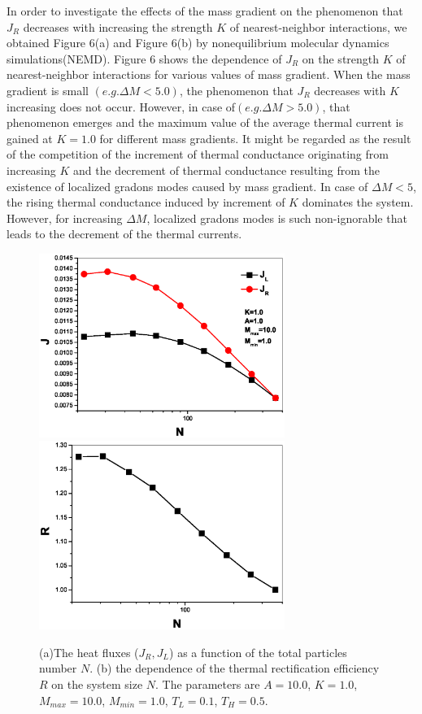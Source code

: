\documentclass[pra,preprint,superscriptaddress,showkeys,showpacs]{revtex4}
\begin{document}
\indent In order to investigate the effects of the mass gradient on
the phenomenon that $J_{R}$ decreases with increasing the strength
$K$ of nearest-neighbor interactions, we obtained Figure 6(a) and
Figure 6(b) by nonequilibrium molecular dynamics simulations(NEMD).
Figure 6 shows the dependence of $J_{R}$ on the strength $K$ of
nearest-neighbor interactions for various values of mass gradient.
When the mass gradient is small $(e.g. \Delta M<5.0)$, the
phenomenon that $J_{R}$ decreases with $K$ increasing does not
occur. However, in case of$(e.g. \Delta M>5.0)$, that phenomenon
emerges and the maximum value of the average thermal current is
gained at $K=1.0$ for different mass gradients. It might be regarded
as the result of the competition of the increment of thermal
conductance originating from increasing $K$\cite{a23} and the
decrement of thermal conductance resulting from the existence of
localized gradons modes\cite{a31} caused by mass gradient. In case
of $\Delta M<5$, the rising thermal conductance induced by increment
of $K$ dominates the system. However,
for increasing $\Delta M$, localized gradons modes\cite{a31} is such non-ignorable that leads to the decrement of the thermal currents. \\
\begin{figure}
\centering
\includegraphics[width=8cm]{fig7a.eps}
\centering
\includegraphics[width=8cm]{fig7b.eps}
\caption{(a)The heat fluxes ($J_{R},J_{L}$) as a function of the total
particles number $N$. (b) the dependence of the thermal
rectification efficiency $R$ on the system size $N$. The parameters
are $A=10.0$, $K=1.0$, $M_{max}=10.0$, $M_{min}=1.0$, $T_{L}=0.1$,
$T_{H}=0.5$.}
\end{figure}
\end{document}
